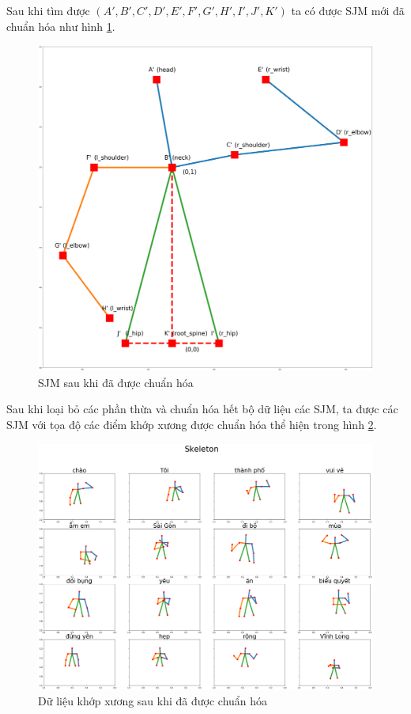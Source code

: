Sau khi tìm được $(A', B', C', D', E', F', G' , H' , I' , J', K')$ ta có được SJM mới đã chuẩn hóa như hình \ref{fig:skeleton_2}.

\FloatBarrier
\begin{figure}[htp]
\begin{center}
\includegraphics[scale=0.14]{chap4/c4_figs/skeleton_2.png}
\end{center}
\caption{SJM sau khi đã được chuẩn hóa}
\label{fig:skeleton_2}
\end{figure}
\FloatBarrier

Sau khi loại bỏ các phần thừa và chuẩn hóa hết bộ dữ liệu các SJM, ta được các SJM với tọa độ các điểm khớp xương được chuẩn hóa thể hiện trong hình \ref{fig:skeleton_normalize}.
\FloatBarrier
\begin{figure}[htp]
\begin{center}
\includegraphics[scale=0.28]{chap4/c4_figs/datajoint.png}
\end{center}
\caption{Dữ liệu khớp xương sau khi đã được chuẩn hóa}
\label{fig:skeleton_normalize}
\end{figure}
\FloatBarrier

